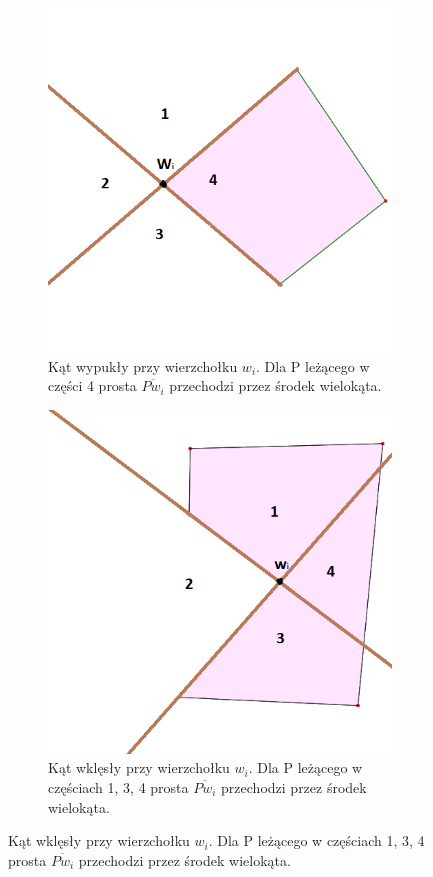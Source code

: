 \documentclass{article}
\begin{document}
\begin{figure}[ht] %
\caption{}
\centering
\begin{subfigure}{.5\textwidth}
\centering
\caption{Kąt wypukły przy wierzchołku $w_i$. Dla P leżącego \newline w części 4 prosta $\overline{Pw_i}$ przechodzi przez środek wielokąta.}
\includegraphics[width=.75\linewidth]{rys4a.png}
\end{subfigure}%
\begin{subfigure}{.5\textwidth}
\centering
\caption{Kąt wklęsły przy wierzchołku $w_i$. Dla P leżącego w częściach 1, 3, 4 prosta $\overline{Pw_i}$ przechodzi przez środek wielokąta.}
\includegraphics[width=.75\linewidth]{rys4b.png}
\end{subfigure}%
\end{figure}
\end{document}
